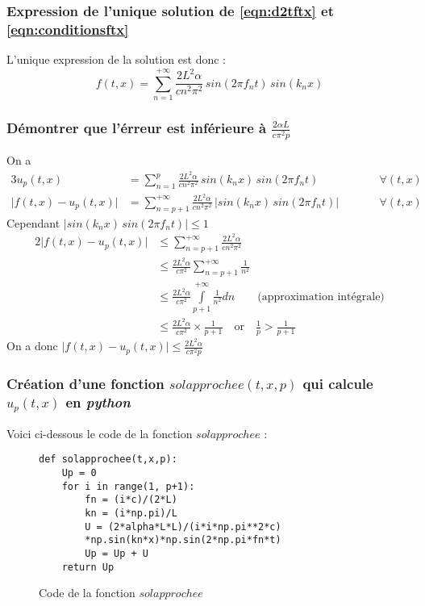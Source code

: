 \documentclass[12pt]{article}
\begin{document}
\subsubsection{Expression de l'unique solution de \eqref{eqn:d2tftx} et \eqref{eqn:conditionsftx}}
L'unique expression de la solution est donc :
\begin{equation}
	f(t,x)=\sum\limits_{n=1}^{+\infty} \frac{2L^2 \alpha}{cn^2\pi^2}\,sin(2\pi f_n t)\,sin(k_n x)
\end{equation}
\subsubsection{Démontrer que l'érreur est inférieure à $\frac{2\alpha L}{c\pi^2 p}$}
On a 
\begin{alignat*}{3}
	u_p(t,x)&=\sum\limits_{n=1}^{p} \frac{2L^2 \alpha}{cn^2\pi^2}\,sin(k_n x)\,sin(2\pi f_n t)\quad &&\forall(t,x) \\
	\lvert f(t,x)-u_p(t,x) \rvert &=\sum\limits_{n=p+1}^{+\infty} \frac{2L^2 \alpha}{cn^2\pi^2}\,\lvert sin(k_n x)\,sin(2\pi f_n t) \rvert \qquad &&\forall(t,x)
\end{alignat*}
Cependant $\lvert sin(k_n x)\,sin(2\pi f_n t) \rvert \leq 1$ \\
\begin{alignat*}{2}
	\lvert f(t,x)-u_p(t,x) \rvert 	&\leq \sum\limits_{n=p+1}^{+\infty} \frac{2L^2 \alpha}{cn^2\pi^2} \\
									&\leq \frac{2L^2 \alpha}{c\pi^2} \sum\limits_{n=p+1}^{+\infty} \frac{1}{n^2} \\
									&\leq \frac{2L^2 \alpha}{c\pi^2} \int\limits_{p+1}^{+\infty} \frac{1}{n^2} dn \qquad \text{(approximation intégrale)} \\
									&\leq \frac{2L^2 \alpha}{c\pi^2} \times \frac{1}{p+1} \quad \text{or} \quad \frac{1}{p}>\frac{1}{p+1}
\end{alignat*}
On a donc $\boxed{\lvert f(t,x)-u_p(t,x) \rvert \leq \frac{2L^2 \alpha}{c\pi^2 p}}$
\subsubsection{Création d'une fonction $solapprochee(t,x,p)$ qui calcule $u_p(t,x)$ en \textit{python}}
Voici ci-dessous le code de la fonction $solapprochee$ :
\begin{figure}[h]
\centering
\begin{minipage}{12cm} %
\begin{lstlisting}[style=stylepython]
def solapprochee(t,x,p):
    Up = 0
    for i in range(1, p+1):
        fn = (i*c)/(2*L)
        kn = (i*np.pi)/L
        U = (2*alpha*L*L)/(i*i*np.pi**2*c)
        *np.sin(kn*x)*np.sin(2*np.pi*fn*t)
        Up = Up + U
    return Up

\end{lstlisting}
\end{minipage} %
\caption{Code de la fonction $solapprochee$}
\end{figure}
\end{document}
